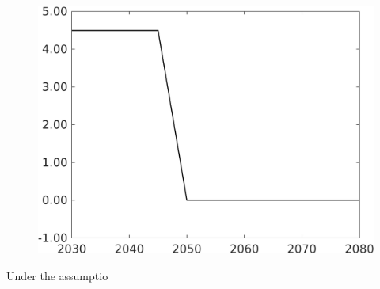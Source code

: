 \begin{figure}[h!!]
\begin{minipage}[]{0.32\textwidth}
\end{minipage}
\begin{minipage}[]{0.32\textwidth}
	\includegraphics[width=1\textwidth]{../../codding_model/own_basedOnFried/optimalPol_elastS_DisuSci/figures/all_1705/Single_OPT_T_NoTaus_Emnet_spillover0_sep1_etaa1.00.png}
\end{minipage}
\end{figure} 
Under the assumptio